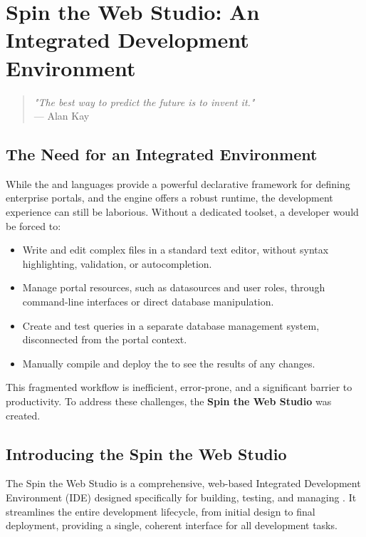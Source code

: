 \chapter{Spin the Web Studio: An Integrated Development Environment}
\label{chap:studio}

\begin{quote}
\textit{"The best way to predict the future is to invent it."} \\
— Alan Kay
\end{quote}

\section{The Need for an Integrated Environment}
\label{sec:studio-need}

While the \wbdl{} and \wbpl{} languages provide a powerful declarative framework for defining enterprise portals, and the \webspinner{} engine offers a robust runtime, the development experience can still be laborious. Without a dedicated toolset, a developer would be forced to:

\begin{itemize}
    \item Write and edit complex \wbdl{} files in a standard text editor, without syntax highlighting, validation, or autocompletion.
    \item Manage portal resources, such as datasources and user roles, through command-line interfaces or direct database manipulation.
    \item Create and test \wbpl{} queries in a separate database management system, disconnected from the portal context.
    \item Manually compile and deploy the \webbase{} to see the results of any changes.
\end{itemize}

This fragmented workflow is inefficient, error-prone, and a significant barrier to productivity. To address these challenges, the \textbf{Spin the Web Studio} was created.

\section{Introducing the Spin the Web Studio}
\label{sec:studio-intro}

The Spin the Web Studio is a comprehensive, web-based Integrated Development Environment (IDE) designed specifically for building, testing, and managing . It streamlines the entire development lifecycle, from initial design to final deployment, providing a single, coherent interface for all development tasks.

